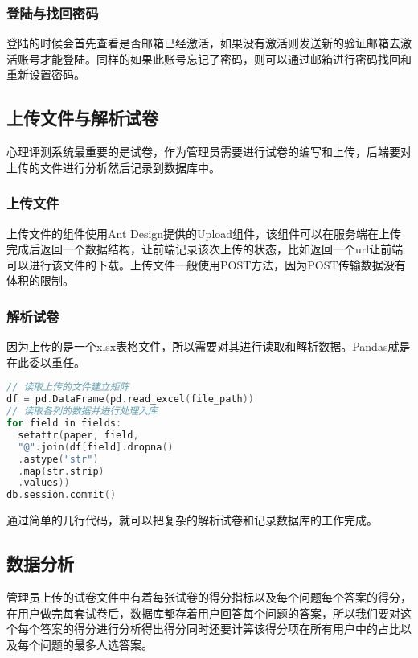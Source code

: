 \subsubsection{登陆与找回密码}

登陆的时候会首先查看是否邮箱已经激活，如果没有激活则发送新的验证邮箱去激活账号才能登陆。同样的如果此账号忘记了密码，则可以通过邮箱进行密码找回和重新设置密码。

\subsection{上传文件与解析试卷}

心理评测系统最重要的是试卷，作为管理员需要进行试卷的编写和上传，后端要对上传的文件进行分析然后记录到数据库中。

\subsubsection{上传文件}

上传文件的组件使用Ant Design提供的Upload组件，该组件可以在服务端在上传完成后返回一个数据结构，让前端记录该次上传的状态，比如返回一个url让前端可以进行该文件的下载。上传文件一般使用POST方法，因为POST传输数据没有体积的限制。

\subsubsection{解析试卷}

因为上传的是一个xlsx表格文件，所以需要对其进行读取和解析数据。Pandas就是在此委以重任。

\begin{lstlisting}[language=C]
// 读取上传的文件建立矩阵
df = pd.DataFrame(pd.read_excel(file_path))
// 读取各列的数据并进行处理入库
for field in fields:
  setattr(paper, field, 
  "@".join(df[field].dropna()
  .astype("str")
  .map(str.strip)
  .values))
db.session.commit()
\end{lstlisting}

通过简单的几行代码，就可以把复杂的解析试卷和记录数据库的工作完成。

\subsection{数据分析}

管理员上传的试卷文件中有着每张试卷的得分指标以及每个问题每个答案的得分，在用户做完每套试卷后，数据库都存着用户回答每个问题的答案，所以我们要对这个每个答案的得分进行分析得出得分同时还要计筭该得分项在所有用户中的占比以及每个问题的最多人选答案。

